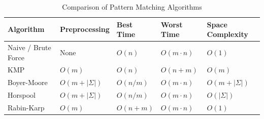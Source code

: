 \documentclass[11pt,a4paper]{article}
\begin{document}
\begin{table}[h]
  \centering
  \caption{Comparison of Pattern Matching Algorithms}
  \begin{tabularx}{\textwidth}{@{}lXXXX@{}}
    \toprule
    \textbf{Algorithm}  & \textbf{Preprocessing} & \textbf{Best Time} & \textbf{Worst Time} & \textbf{Space Complexity} \\ \midrule
    Naive / Brute Force & None                   & $O(n)$             & $O(m \cdot n)$      & $O(1)$                    \\
    KMP                 & $O(m)$                 & $O(n)$             & $O(n + m)$          & $O(m)$                    \\
    Boyer-Moore         & $O(m + |\Sigma|)$      & $O(n / m)$         & $O(m \cdot n)$      & $O(m + |\Sigma|)$         \\
    Horspool            & $O(m + |\Sigma|)$      & $O(n / m)$         & $O(m \cdot n)$      & $O(|\Sigma|)$             \\
    Rabin-Karp          & $O(m)$                 & $O(n + m)$         & $O(m \cdot n)$      & $O(1)$                    \\ \bottomrule
  \end{tabularx}
\end{table}
\end{document}
